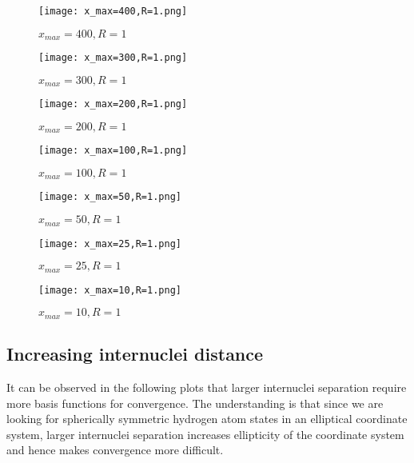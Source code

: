 \documentclass [11pt,a4paper]{report}
\begin{document}
\graphicspath{{/Users/JohnnyLin/Desktop/HumboldtProgram/HU_AMO_techincal_report/AMO_report_decreasing_box_size/}}
\begin{figure}[H]
  \centering
  \texttt{[image: x\_max=400,R=1.png]}
  \caption{$x_{max}=400,R=1$}
  \label{x_max=400,R=1}
\end{figure}

\begin{figure}[H]
  \centering
  \texttt{[image: x\_max=300,R=1.png]}
  \caption{$x_{max}=300,R=1$}
  \label{x_max=300,R=1}
\end{figure}

\begin{figure}[H]
  \centering
  \texttt{[image: x\_max=200,R=1.png]}
  \caption{$x_{max}=200,R=1$}
  \label{x_max=200,R=1}
\end{figure}

\begin{figure}[H]
  \centering
  \texttt{[image: x\_max=100,R=1.png]}
  \caption{$x_{max}=100,R=1$}
  \label{x_max=100,R=1}
\end{figure}

\begin{figure}[H]
  \centering
  \texttt{[image: x\_max=50,R=1.png]}
  \caption{$x_{max}=50,R=1$}
  \label{x_max=50,R=1}
\end{figure}

\begin{figure}[H]
  \centering
  \texttt{[image: x\_max=25,R=1.png]}
  \caption{$x_{max}=25,R=1$}
  \label{x_max=25,R=1}
\end{figure}

\begin{figure}[H]
  \centering
  \texttt{[image: x\_max=10,R=1.png]}
  \caption{$x_{max}=10,R=1$}
  \label{x_max=10,R=1}
\end{figure}


\subsection{Increasing internuclei distance}
It can be observed in the following plots that larger internuclei separation require more basis functions for convergence. The understanding is that since we are looking for spherically symmetric hydrogen atom states in an elliptical coordinate system, larger internuclei separation increases ellipticity of the coordinate system and hence makes convergence more difficult.
\end{document}
